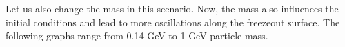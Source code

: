 Let us also change the mass in this scenario. Now, the mass also influences the initial conditions and lead to more oscillations along the freezeout surface. The following graphs range from 0.14 GeV to 1 GeV particle mass.\\
